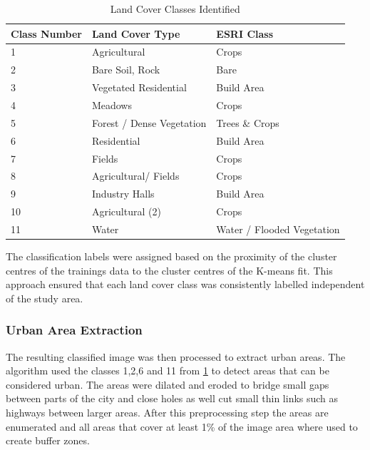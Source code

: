 \documentclass[12pt,a4paper, english]{article}
\begin{document}
      \begin{table}[ht]
      \centering
      \renewcommand{\arraystretch}{1.4}
      \caption{Land Cover Classes Identified}\label{tab:land_cover_classes}
      \begin{tabular}{p{1cm}p{4cm}l}
      \toprule
      \textbf{Class Number} & \textbf{Land Cover Type} & \textbf{ESRI Class}\\
      \midrule
      1 &  Agricultural & Crops\\
      2 &  Bare Soil, Rock & Bare \\
      3 &  Vegetated Residential & Build Area\\
      4 &  Meadows & Crops\\
      5 &  Forest / Dense Vegetation & Trees \& Crops \\
      6 &  Residential & Build Area\\
      7 &  Fields & Crops\\
      8 &  Agricultural/ Fields & Crops\\
      9 &  Industry Halls & Build Area\\
      10 &  Agricultural (2) & Crops\\
      11 &  Water& Water / Flooded Vegetation\\
      \bottomrule
      \end{tabular}
      \end{table}

      The classification labels were assigned based on the proximity of the cluster centres of the trainings data to the cluster centres of the K-means fit.
      This approach ensured that each land cover class was consistently labelled independent of the study area.\\
    \subsubsection{Urban Area Extraction}
      The resulting classified image was then processed to extract urban areas.
      The algorithm used the classes 1,2,6 and 11 from \cref{tab:land_cover_classes} to detect areas that can be considered urban.
      The areas were \gls{dilated} and \gls{eroded} to bridge small gaps between parts of the city and close holes as well cut small thin links such as highways between larger areas.
      After this preprocessing step the areas are enumerated and all areas that cover at least 1\% of the image area where used to create buffer zones. 
  
\end{document}
